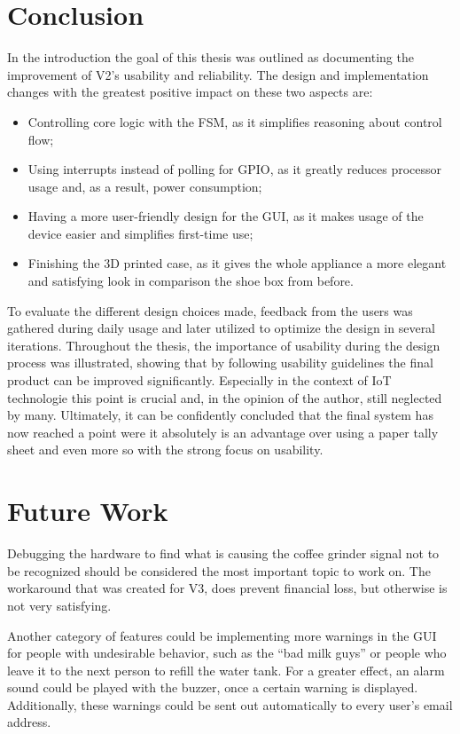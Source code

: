 \documentclass[12pt]{article}
\begin{document}
\section{Conclusion}
In the introduction the goal of this thesis was outlined as documenting the improvement of V2's usability and reliability.
The design and implementation changes with the greatest positive impact on these two aspects are:
\begin{itemize}
  \item Controlling core logic with the FSM, as it simplifies reasoning about control flow;
  \item Using interrupts instead of polling for GPIO, as it greatly reduces processor usage and, as a result, power consumption;
  \item Having a more user-friendly design for the GUI, as it makes usage of the device easier and simplifies first-time use;
  \item Finishing the 3D printed case, as it gives the whole appliance a more elegant and satisfying look in comparison the shoe box from before.
\end{itemize}

To evaluate the different design choices made,
feedback from the users was gathered during daily usage
and later utilized to optimize the design in several iterations.
Throughout the thesis, the importance of usability during the design process was illustrated,
showing that by following usability guidelines the final product can be improved significantly.
Especially in the context of IoT technologie this point is crucial and, in the opinion of the author,
still neglected by many.
Ultimately, it can be confidently concluded that the final system
has now reached a point were it absolutely is an advantage over using a paper tally sheet
and even more so with the strong focus on usability.

\section{Future Work}
Debugging the hardware to find what is causing the coffee grinder signal not to be recognized 
should be considered the most important topic to work on.
The workaround that was created for V3, does prevent financial loss, but otherwise is not very satisfying.

Another category of features could be implementing more warnings in the GUI for people with undesirable behavior,
such as the ``bad milk guys'' or people who leave it to the next person to refill the water tank.
For a greater effect, an alarm sound could be played with the buzzer, once a certain warning is displayed.
Additionally, these warnings could be sent out automatically to every user's email address.
\end{document}
